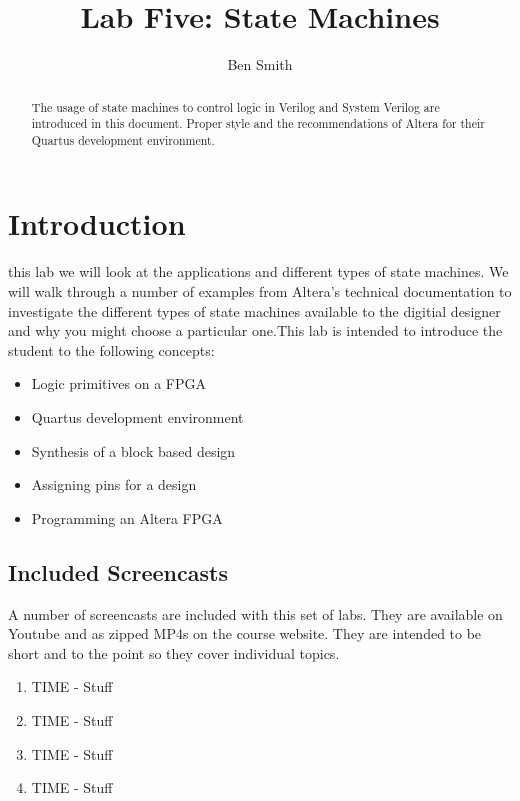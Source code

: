 \title{Lab Five: State Machines}
\author{Ben Smith}




  \maketitle
    \begin{abstract}
      The usage of state machines to control logic in Verilog and System Verilog are introduced in this document. Proper style and the recommendations of Altera for their Quartus development environment.
    \end{abstract}
\section{ Introduction}
   this lab we will look at the applications and different types of state machines. We will walk through a number of examples from Altera's technical documentation to investigate the different types of state machines available to the digitial designer and why you might choose a particular one.This lab is intended to introduce the student to the following concepts:
    \begin{itemize}
       \item Logic primitives on a FPGA
       \item Quartus development environment
       \item Synthesis of a block based design
       \item Assigning pins for a design
       \item Programming an Altera FPGA
    \end{itemize}

    \subsection{Included Screencasts}
      A number of screencasts are included with this set of labs. They are available on Youtube and as zipped MP4s on the course website. They are intended to be short and to the point so they cover individual topics.
      \begin{enumerate}
        \item TIME - Stuff
        \item TIME - Stuff
        \item TIME - Stuff
        \item TIME - Stuff
      \end{enumerate}


